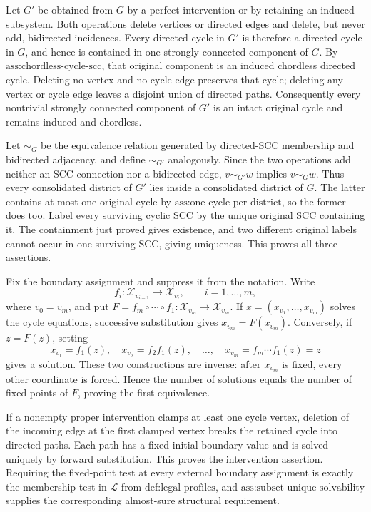 Let \(G'\) be obtained from \(G\) by a perfect intervention or by retaining an induced subsystem.  Both operations delete vertices or directed edges and delete, but never add, bidirected incidences.  Every directed cycle in \(G'\) is therefore a directed cycle in \(G\), and hence is contained in one strongly connected component of \(G\).  By \(\text{ass:chordless-cycle-scc}\), that original component is an induced chordless directed cycle.  Deleting no vertex and no cycle edge preserves that cycle; deleting any vertex or cycle edge leaves a disjoint union of directed paths.  Consequently every nontrivial strongly connected component of \(G'\) is an intact original cycle and remains induced and chordless.

Let \(\sim_G\) be the equivalence relation generated by directed-SCC membership and bidirected adjacency, and define \(\sim_{G'}\) analogously.  Since the two operations add neither an SCC connection nor a bidirected edge, \(v\sim_{G'}w\) implies \(v\sim_Gw\).  Thus every consolidated district of \(G'\) lies inside a consolidated district of \(G\).  The latter contains at most one original cycle by \(\text{ass:one-cycle-per-district}\), so the former does too.  Label every surviving cyclic SCC by the unique original SCC containing it.  The containment just proved gives existence, and two different original labels cannot occur in one surviving SCC, giving uniqueness.  This proves all three assertions.

Fix the boundary assignment and suppress it from the notation.  Write
\[
 f_i:\mathcal X_{v_{i-1}}\longrightarrow\mathcal X_{v_i},\qquad i=1,\ldots,m,
\]
where \(v_0=v_m\), and put \(F=f_m\circ\cdots\circ f_1:\mathcal X_{v_m}\to\mathcal X_{v_m}\).  If \(x=(x_{v_1},\ldots,x_{v_m})\) solves the cycle equations, successive substitution gives \(x_{v_m}=F(x_{v_m})\).  Conversely, if \(z=F(z)\), setting
\[
 x_{v_1}=f_1(z),\quad x_{v_2}=f_2f_1(z),\quad\ldots,\quad x_{v_m}=f_m\cdots f_1(z)=z
\]
gives a solution.  These two constructions are inverse: after \(x_{v_m}\) is fixed, every other coordinate is forced.  Hence the number of solutions equals the number of fixed points of \(F\), proving the first equivalence.

If a nonempty proper intervention clamps at least one cycle vertex, deletion of the incoming edge at the first clamped vertex breaks the retained cycle into directed paths.  Each path has a fixed initial boundary value and is solved uniquely by forward substitution.  This proves the intervention assertion.  Requiring the fixed-point test at every external boundary assignment is exactly the membership test in \(\mathcal L\) from \(\text{def:legal-profiles}\), and \(\text{ass:subset-unique-solvability}\) supplies the corresponding almost-sure structural requirement.

